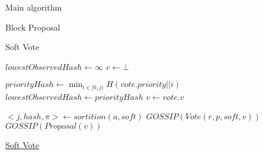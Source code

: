 \documentclass[10pt,a4paper]{article}
\begin{document}
\begin{section}{Main algorithm}
\begin{subsection}{Block Proposal}

\end{subsection}
\begin{subsection}{Soft Vote}\label{ssect:softvote}

\begin{algorithm}[H]
    \begin{algorithmic}[1]
    \State $lowestObservedHash \gets \infty$
    \State $v \gets \bot$ 


        \State $priorityHash \gets \min_{i \in [0, j)} H(vote.priority || i)$
            \State $lowestObservedHash \gets priorityHash$
            \State $v \gets vote.v$
        \EndIf    
    \EndFor

        \State $<j, hash, \pi> \gets sortition(a, soft)$
            \State $GOSSIP(Vote(r, p, soft, v))$
                \State $GOSSIP(Proposal(v))$
            \EndIf
        \EndIf
    \EndFor

    \EndFunction
    \end{algorithmic}
    \caption{\underline{Soft Vote}}
\end{algorithm}



\end{subsection}
\end{section}
\end{document}
